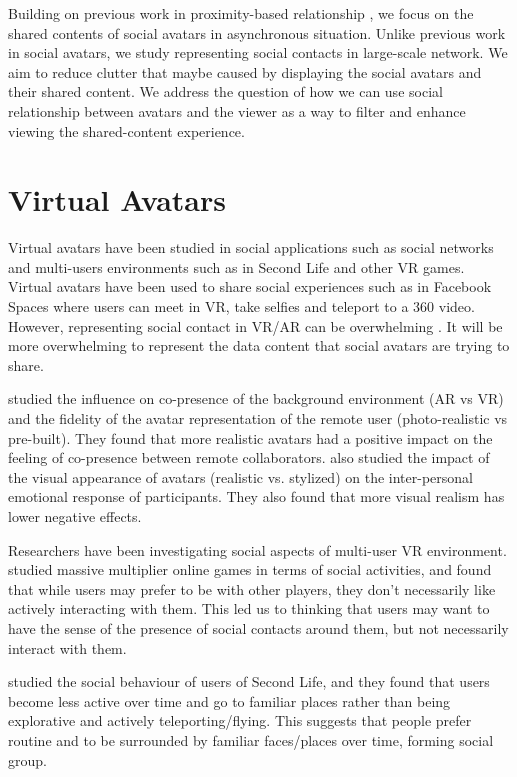 Building on previous work in proximity-based relationship \cite{Sousa2016}, we focus on the shared contents of social avatars in asynchronous situation. Unlike previous work in social avatars, we study representing social contacts in large-scale network. We aim to reduce clutter that maybe caused by displaying the social avatars and their shared content. We address the question of how we can use social relationship between avatars and the viewer as a way to filter and enhance viewing the shared-content experience. 


\section{Virtual Avatars}

Virtual avatars have been studied in social applications such as social networks and multi-users environments such as in Second Life \cite{Kaplan2009} and other VR games. Virtual avatars have been used to share social experiences such as in Facebook Spaces\cite{Facebook} where users can meet in VR, take selfies and teleport to a 360 video. However, representing social contact in VR/AR can be overwhelming \cite{Nassani2017b}. It will be more overwhelming to represent the data content that social avatars are trying to share. 

\cite{Jo2016} studied the influence on co-presence of the background environment (AR vs VR) and the fidelity of the avatar representation of the remote user (photo-realistic vs pre-built). They found that more realistic avatars had a positive impact on the feeling of co-presence between remote collaborators. \cite{Volante2016} also studied the impact of the visual appearance of avatars (realistic vs. stylized) on the inter-personal emotional response of participants. They also found that more visual realism has lower negative effects.

Researchers  have been investigating social aspects of multi-user VR environment. \cite{Ducheneaut2006} studied massive multiplier online games in terms of social activities, and  found that while users may prefer to be with other players, they don't necessarily like actively interacting with them. This led us to thinking that users may want to have the sense of the presence of social contacts around them, but not necessarily interact with them.

\cite{Harris2009} studied the social behaviour of users of Second Life, and they found that users become less active over time and go to familiar places rather than being explorative and actively teleporting/flying. This suggests that people prefer routine and to be surrounded by familiar faces/places over time, forming social group.


